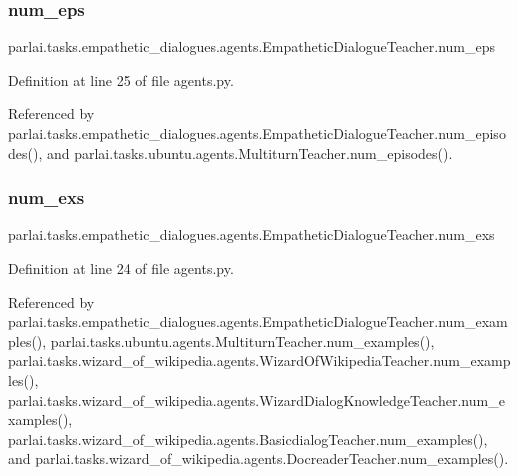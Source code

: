 \subsubsection{\texorpdfstring{num\+\_\+eps}{num\_eps}}
{\footnotesize\ttfamily parlai.\+tasks.\+empathetic\+\_\+dialogues.\+agents.\+Empathetic\+Dialogue\+Teacher.\+num\+\_\+eps}



Definition at line 25 of file agents.\+py.



Referenced by parlai.\+tasks.\+empathetic\+\_\+dialogues.\+agents.\+Empathetic\+Dialogue\+Teacher.\+num\+\_\+episodes(), and parlai.\+tasks.\+ubuntu.\+agents.\+Multiturn\+Teacher.\+num\+\_\+episodes().

\mbox{\label{classparlai_1_1tasks_1_1empathetic__dialogues_1_1agents_1_1EmpatheticDialogueTeacher_ab02581b56d9b8ed536a9e662f3cbc8e6}} 
\subsubsection{\texorpdfstring{num\+\_\+exs}{num\_exs}}
{\footnotesize\ttfamily parlai.\+tasks.\+empathetic\+\_\+dialogues.\+agents.\+Empathetic\+Dialogue\+Teacher.\+num\+\_\+exs}



Definition at line 24 of file agents.\+py.



Referenced by parlai.\+tasks.\+empathetic\+\_\+dialogues.\+agents.\+Empathetic\+Dialogue\+Teacher.\+num\+\_\+examples(), parlai.\+tasks.\+ubuntu.\+agents.\+Multiturn\+Teacher.\+num\+\_\+examples(), parlai.\+tasks.\+wizard\+\_\+of\+\_\+wikipedia.\+agents.\+Wizard\+Of\+Wikipedia\+Teacher.\+num\+\_\+examples(), parlai.\+tasks.\+wizard\+\_\+of\+\_\+wikipedia.\+agents.\+Wizard\+Dialog\+Knowledge\+Teacher.\+num\+\_\+examples(), parlai.\+tasks.\+wizard\+\_\+of\+\_\+wikipedia.\+agents.\+Basicdialog\+Teacher.\+num\+\_\+examples(), and parlai.\+tasks.\+wizard\+\_\+of\+\_\+wikipedia.\+agents.\+Docreader\+Teacher.\+num\+\_\+examples().

